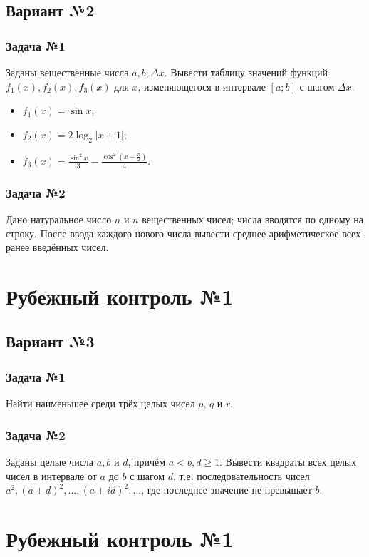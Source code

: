\documentclass[12pt,a5paper,landscape]{article}
\begin{document}
\subsection*{Вариант №2}
\subsubsection*{Задача №1}
Заданы вещественные числа $a, b, \Delta x$. Вывести таблицу значений функций $f_1(x), f_2(x), f_3(x)$ для $x$, изменяющегося в интервале $[a;b]$ с шагом $\Delta x$.
\begin{itemize}
\item $f_1(x) = \sin{x}$;
\item $f_2(x) = 2 \log_2{|x + 1|}$;
\item $f_3(x) = \frac{\sin^2{x}}{3} - \frac{\cos^2{(x+\frac{\pi}{2})}}{4}$.
\end{itemize}
\subsubsection*{Задача №2}
Дано натуральное число $n$ и $n$ вещественных чисел; числа вводятся по одному на строку. После ввода каждого нового числа вывести среднее арифметическое всех ранее введённых чисел.


\clearpage
\section*{Рубежный контроль №1}
\subsection*{Вариант №3}
\subsubsection*{Задача №1}
Найти наименьшее среди трёх целых чисел $p$, $q$ и $r$.
\subsubsection*{Задача №2}
Заданы целые числа $a, b$ и $d$, причём $a < b, d \ge 1$. Вывести квадраты всех целых чисел в интервале от $a$ до $b$ с шагом $d$, т.е. последовательность чисел $a^2, (a+d)^2, \ldots, (a + id)^2, \ldots$, где последнее значение не превышает $b$.


\clearpage
\section*{Рубежный контроль №1}
\end{document}
